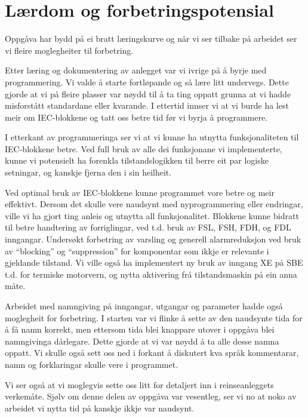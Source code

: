 \section{Lærdom og forbetringspotensial}
\thispagestyle{fancy}

Oppgåva har bydd på ei bratt læringskurve og når vi ser tilbake på arbeidet ser vi fleire moglegheiter til forbetring.

Etter læring og dokumentering av anlegget var vi ivrige på å byrje med programmering.
Vi valde å starte fortløpande og så lære litt undervegs.
Dette gjorde at vi på fleire plasser var nøydd til å ta ting oppatt grunna at vi hadde misforstått standardane eller kvarande.
I ettertid innser vi at vi burde ha lest meir om \gls{IEC}-blokkene og tatt oss betre tid før vi byrja å programmere.

I etterkant av programmeringa ser vi at vi kunne ha utnytta funksjonaliteten til \gls{IEC}-blokkene betre. 
Ved full bruk av alle dei funksjonane vi implementerte, kunne vi potensielt ha forenkla tilstandslogikken til berre eit par logiske setningar, 
og kanskje fjerna den i sin heilheit.

Ved optimal bruk av \gls{IEC}-blokkene kunne programmet vore betre og meir effektivt. 
Dersom det skulle vere naudsynt med nyprogrammering eller endringar, ville vi ha gjort ting anleis og utnytta all funksjonalitet.
Blokkene kunne bidratt til betre handtering av forriglingar, ved t.d. bruk av FSL, FSH, FDH, og FDL inngangar. \newline
Undersøkt forbetring av varsling og generell alarmreduksjon ved bruk av ``blocking'' og ``suppression'' for komponentar som ikkje er relevante i gjeldande tilstand.
Vi ville også ha implementert ny bruk av inngang XE på \gls{SBE} t.d. for termiske motorvern, og nytta aktivering frå tilstandsmaskin på ein anna måte.

Arbeidet med namngiving på inngangar, utgangar og parameter hadde også moglegheit for forbetring.
I starten var vi flinke å sette av den naudsynte tida for å få namn korrekt, men ettersom tida blei knappare utover i oppgåva
blei namngivinga dårlegare. Dette gjorde at vi var nøydd å ta alle desse namna oppatt. \newline
Vi skulle også sett oss ned i forkant å diskutert kva språk kommentarar, namn og forklaringar skulle vere i programmet.

Vi ser også at vi moglegvis sette oss litt for detaljert inn i reinseanleggets verkemåte.
Sjølv om denne delen av oppgåva var vesentleg, ser vi no at noko av arbeidet vi nytta tid på kanskje ikkje var naudsynt.

